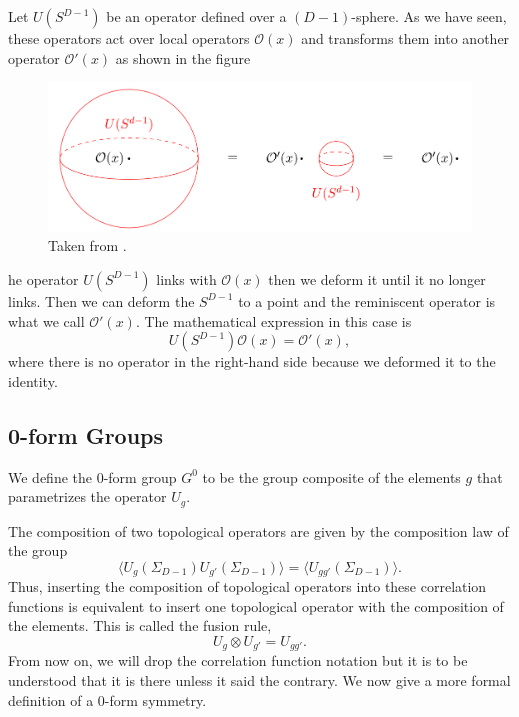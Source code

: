 \documentclass{article}
\begin{document}
Let   $U(S^{D-1})$ be an operator defined over a $(D-1)$-sphere.  As we have seen, these operators act over local operators $\mathcal{O}(x)$ and transforms them into another operator $\mathcal{O}'(x)$  as shown in the figure
\begin{figure}[h]
\centering
\includegraphics[scale=0.4]{figures/linking.png}
\caption{Taken from \cite{Bhardwaj}.}
\end{figure}
he operator $U(S^{D-1})$ links with $\mathcal{O}(x)$ then we deform it until it no longer links. Then we can deform the $S^{D-1}$ to a point and the reminiscent operator is what we call $\mathcal{O}'(x).$ The mathematical expression in this case is 
\begin{equation}
	U(S^{D-1})\mathcal{O}(x)=\mathcal{O}'(x),
\end{equation}
where there is no operator in the right-hand side because we deformed it to the identity. 
\subsection{0-form Groups}
We define the 0-form group $G^{0}$ to be the group composite of the elements $g$ that parametrizes the operator $U_g.$

The composition of two topological operators are given by the composition law of the group
\begin{equation}
	\langle U_g(\Sigma_{D-1})U_{g'}(\Sigma_{D-1})\rangle=\langle U_{gg'}(\Sigma_{D-1})\rangle.
\end{equation}
Thus, inserting the composition of topological operators into these correlation functions is equivalent to insert one topological operator with the composition of the elements. This is called the fusion rule,
\begin{equation}
	U_g\otimes U_{g'}=U_{gg'}.
\end{equation}
From now on, we will drop the correlation function notation but it is to be understood that it is there unless it said the contrary.  We now give a more formal definition of a 0-form symmetry. 
\end{document}
